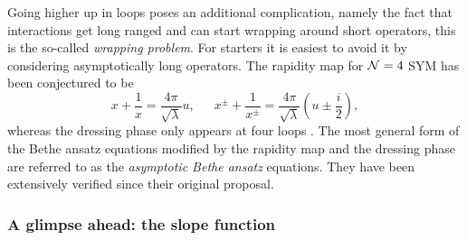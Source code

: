 Going higher up in loops poses an additional complication, namely the fact that interactions get long ranged and can start wrapping around short operators, this is the so-called \emph{wrapping problem}.
For starters it is easiest to avoid it by considering asymptotically long operators. 
The rapidity map for $\mathcal{N}=4$ SYM has been conjectured to be \cite{Beisert:2004hm}
\begin{equation}
	x + \frac{1}{x} = \frac{4 \pi}{\sqrt{\lambda}} u, \,\,\,\,\,\,\,\,\, x^{\pm} + \frac{1}{x^{\pm}} = \frac{4 \pi}{\sqrt{\lambda}} \left( u \pm \frac{i}{2} \right),
\end{equation}
whereas the dressing phase only appears at four loops \cite{Beisert:2006ez}. 
The most general form of the Bethe ansatz equations  modified by the rapidity map and the dressing phase are referred to as the \emph{asymptotic Bethe ansatz} equations.
They have been extensively verified \cite{Arutyunov:2003rg,Giombi:2010zi} since their original proposal.


\subsubsection{A glimpse ahead: the slope function}
\label{sec:slope_function_aba}

